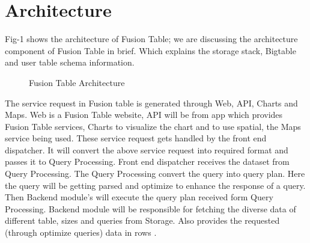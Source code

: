 \documentclass[9pt,twocolumn,twoside]{styles/osajnl}
\begin{document}
\section{Architecture}

Fig-1 shows the architecture of Fusion Table; we are discussing the architecture component of Fusion Table in brief. Which explains the storage stack, Bigtable and user table schema information. 
 

\begin{figure}[htbp]
	\centering
	\caption{Fusion Table Architecture }
	\label{fig:false-color}
\end{figure}

The service request in Fusion table is generated through Web, API, Charts and Maps. Web is a Fusion Table website, API will be from app which provides Fusion Table services, Charts to visualize the chart and to use spatial, the Maps service being used. These service request gets handled by the front end dispatcher. It will convert the above service request into required format and passes it to Query Processing. Front end dispatcher receives the dataset from Query Processing. The Query Processing convert the query into query plan. Here the query will be getting parsed and optimize to enhance the response of a query. Then Backend module’s will execute the query plan received form Query Processing. Backend module will be responsible for fetching the diverse data of different table, sizes and queries from Storage. Also provides the requested (through optimize queries) data in rows \cite{www-6}.
\end{document}
